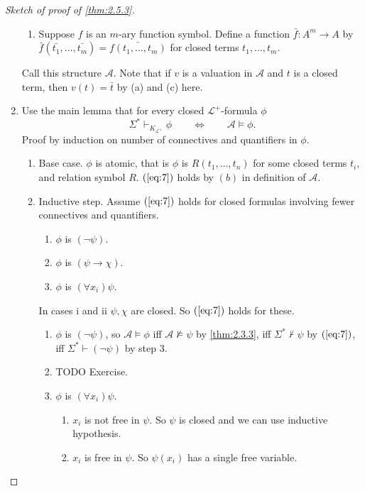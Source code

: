 \documentclass{article}
\newcommand{\rb}[1]{\left( #1 \right)}
\newcommand{\notb}[1]{\rb{\neg #1}}
\newcommand{\impb}[2]{\rb{#1 \rightarrow #2}}
\newcommand{\fab}[1]{\rb{\forall #1}}
\theoremstyle{definition}\newtheorem{definition}{Definition}[subsection]
\theoremstyle{definition}\newtheorem{remark}[definition]{Remark}
\theoremstyle{definition}\newtheorem*{example}{Example}
\theoremstyle{definition}\newtheorem*{note}{Note}
\begin{document}
\begin{proof}[Sketch of proof of \ref{thm:2.5.3}]
\begin{enumerate}
\begin{enumerate}
\item Suppose $ f $ is an $ m $-ary function symbol. Define a function $ \bar{f} : A^m \to A $ by $ \bar{f}\rb{\bar{t_1}, \dots, \bar{t_m}} = \bar{f\rb{t_1, \dots, t_m}} $ for closed terms $ t_1, \dots, t_m $.
\end{enumerate}
Call this structure $ \mathcal{A} $. Note that if $ v $ is a valuation in $ \mathcal{A} $ and $ t $ is a closed term, then $ v\rb{t} = \bar{t} $ by (a) and (c) here.
\item Use the main lemma that for every closed $ \mathcal{L}^+ $-formula $ \phi $
\begin{equation}
\label{eq:7}
\Sigma^* \vdash_{K_{\mathcal{L}^+}} \phi \qquad \iff \qquad \mathcal{A} \vDash \phi.
\end{equation}
Proof by induction on number of connectives and quantifiers in $ \phi $.
\begin{enumerate}
\item Base case. $ \phi $ is atomic, that is $ \phi $ is $ R\rb{t_1, \dots, t_n} $ for some closed terms $ t_i $, and relation symbol $ R $. $ \rb{\ref{eq:7}} $ holds by $ (b) $ in definition of $ \mathcal{A} $.
\item Inductive step. Assume $ \rb{\ref{eq:7}} $ holds for closed formulas involving fewer connectives and quantifiers.
\begin{enumerate}
\item $ \phi $ is $ \notb{\psi} $.
\item $ \phi $ is $ \impb{\psi}{\chi} $.
\item $ \phi $ is $ \fab{x_i}\psi $.
\end{enumerate}
In cases i and ii $ \psi, \chi $ are closed. So $ \rb{\ref{eq:7}} $ holds for these.
\begin{enumerate}
\item $ \phi $ is $ \notb{\psi} $, so $ \mathcal{A} \vDash \phi $ iff $ \mathcal{A} \not\vDash \psi $ by \ref{thm:2.3.3}, iff $ \Sigma^* \not\vdash \psi $ by $ \rb{\ref{eq:7}} $, iff $ \Sigma^* \vdash \notb{\psi} $ by step $ 3 $.
\item TODO Exercise.
\item $ \phi $ is $ \fab{x_i}\psi $.
\begin{enumerate}
\item $ x_i $ is not free in $ \psi $. So $ \psi $ is closed and we can use inductive hypothesis.
\item $ x_i $ is free in $ \psi $. So $ \psi\rb{x_i} $ has a single free variable.
\end{enumerate}

\end{enumerate}
\end{enumerate}
\end{enumerate}
\end{proof}
\end{document}
